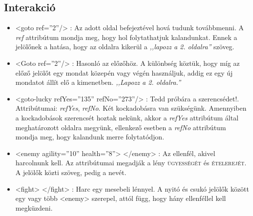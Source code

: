 \documentclass[12pt,a4paper,oneside]{report}
\newcommand{\stat}{\textsc}
\newcommand{\attr}{\emph}
\begin{document}
            
    \subsection{Interakció}
      \begin{itemize}
        \item <{\color{Tag}goto}
          {\color{Attr}ref}={\color{Value}''2''}/> : Az adott oldal
          befejeztével hová tudunk továbbmenni. A \attr{ref} attribútum
          mondja meg, hogy hol folytathatjuk kalandunkat. Ennek a
          jelölőnek a hatása, hogy az oldalra kikerül a \emph{,,lapozz a
            2. oldalra''} szöveg.
    
        \item <{\color{Tag}Goto}
          {\color{Attr}ref}={\color{Value}''2''}/> : Hasonló az
          előzőhöz. A különbség köztük, hogy míg az előző jelölőt egy
          mondat közepén vagy végén használjuk, addig ez egy új mondatot
          állít elő a kimenetben. \emph{,,Lapozz a 2. oldalra.''}
    
        \item <{\color{Tag}goto-lucky}
          {\color{Attr}refYes}={\color{Value}''135''}
          {\color{Attr}refNo}={\color{Value}''273''}/> : Tedd próbára a
          szerencsédet!. Attribútumai: \attr{refYes}, \attr{refNo}. Két
          kockadobásra van szükségünk. Amennyiben a kockadobások
          szerencsét hoztak nekünk, akkor a \attr{refYes} attribútum
          által meghatározott oldalra megyünk, ellenkező esetben a
          \attr{refNo} attribútum mondja meg, hogy kalandunk merre
          folytatódjon.

        \item <{\color{Tag}enemy}
          {\color{Attr}agility}={\color{Value}''10''}
          {\color{Attr}health}={\color{Value}''8''}> </enemy> : Az
          ellenfél, akivel harcolnunk kell. Az attribútumai megadják a
          lény \stat{ügyességét} és \stat{ételerejét}. A jelölők közti
          szöveg, pedig a nevét.

        \item <{\color{Tag}f{}ight}> <{\color{Tag}/f{}ight}> : Harc egy
          mesebeli lénnyel. A nyitó és csukó jelölők között egy vagy
          több <{\color{Tag}enemy}> szerepel, attól függ, hogy hány ellenféllel
          kell megküzdeni.
      \end{itemize}
      
\end{document}
